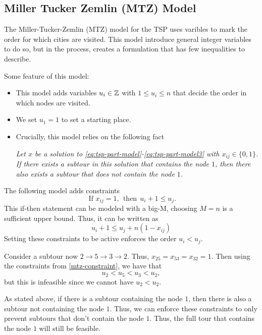 \subsection{Miller Tucker Zemlin (MTZ) Model}
The Miller-Tucker-Zemlin (MTZ) model for the TSP uses varibles to mark the order for which cities are visited.  This model introduce general integer variables to do so, but in the process, creates a formulation that has few inequalities to describe.

Some feature of this model:
\begin{itemize}
\item This model adds variables $u_i \in \mathbb{Z}$ with $1 \leq u_i \leq n$ that decide the order in which nodes are visited.
\item We set $u_1 = 1$ to set a starting place.
\item Crucially, this model relies on the following fact\\
\begin{center}
\emph{
Let  $x$ be a solution to \eqref{eq:tsp-part-model}-\eqref{eq:tsp-part-model3} with $x_{ij} \in \{0,1\}$.  If there exists a subtour in this solution that contains the node $1$, then there also exists a subtour that does not contain the node $1$.}
\end{center}
\end{itemize}

The following model adds constraints
\begin{equation}
\text{ If } x_{ij} = 1, \ \ \text{then} \ \ u_i + 1 \leq u_j.
\end{equation}
This if-then statement can be modeled with a big-M, choosing $M = n$ is a sufficient upper bound.  Thus, it can be written as 
\begin{equation}
\label{mtz-constraint}
u_i + 1 \leq u_j + n(1-x_{ij})
\end{equation}
Setting these constraints to be active enforces the order $u_i < u_j$.    

Consider a subtour now  $2 \to 5 \to 3 \to 2$.  Thus, $x_{25} = x_{53} = x_{32} = 1$.  Then using the constraints from \eqref{mtz-constraint}, we have that 
\begin{equation}
u_2 < u_5 < u_3 < u_2,
\end{equation}
but this is infeasible since we cannot have $u_2 < u_2$.  

As stated above, if there is a subtour containing the node $1$, then there is also a subtour not containing the node $1$.  Thus, we can enforce these constraints to only prevent subtours that don't contain the node $1$.  Thus, the full tour that contains the node $1$ will still be feasible.

